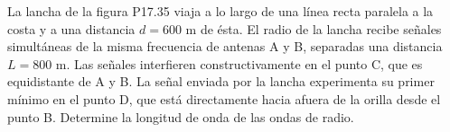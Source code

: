 \item La lancha de la figura P17.35 viaja a lo largo de una línea recta paralela a la costa y a una distancia $d = 600\text{ m}$ de ésta. El radio de la lancha recibe señales simultáneas de la misma frecuencia de antenas A y B, separadas una distancia $L = 800\text{ m}$. Las señales interfieren constructivamente en el punto C, que es equidistante de A y B. La señal enviada por la lancha experimenta su primer mínimo en el punto D, que está directamente hacia afuera de la orilla desde el punto B. Determine la longitud de onda de las ondas de radio.